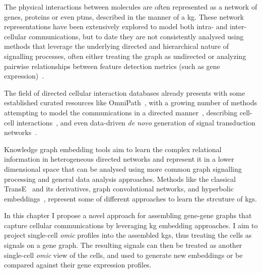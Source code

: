 The physical interactions between molecules are often represented as a network of genes, proteins or even \acrshort{ptm}s, described in the manner of a \acrfull{kg}. These network representations have been extensively explored to model both intra- and inter-cellular communications, but to date they are not consistently analysed using methods that leverage the underlying directed and hierarchical nature of signalling processes, often either treating the graph as undirected or analyzing pairwise relationships between feature detection metrics (such as gene expression)~\cite{pratapa_benchmarking_2020, armingol_deciphering_2020}. 

The field of directed cellular interaction databases already presents with some established curated resources like OmniPath~\cite{turei_integrated_2021}, with a growing number of methods attempting to model the communications in a directed manner~\cite{lefebvre_large-scale_2021}, describing cell-cell interactions~\cite{fischer_modeling_2022,yang_sctenifoldxct_2023}, and even data-driven \emph{de novo} generation of signal transduction networks~\cite{hu_cytotalk_2021}.

Knowledge graph embedding tools aim to learn the complex relational information in heterogeneous directed networks and represent it in a lower dimensional space that can be analysed using more common graph signalling processing and general data analysis approaches. Methods like the classical TransE~\cite{bordes_translating_2013} and its derivatives, graph convolutional networks, and hyperbolic embeddings~\cite{chami_hyperbolic_2019}, represent some of different approaches to learn the strcuture of \acrshort{kg}s.

In this chapter I propose a novel approach for assembling gene-gene graphs that capture cellular communications by leveraging \acrshort{kg} embedding approaches. I aim to project single-cell \emph{omic} profiles into the assembled \acrshort{kg}s, thus treating the cells as signals on a gene graph. The resulting signals can then be treated as another single-cell \emph{omic} view of the cells, and used to generate new embeddings or be compared against their gene expression profiles.


